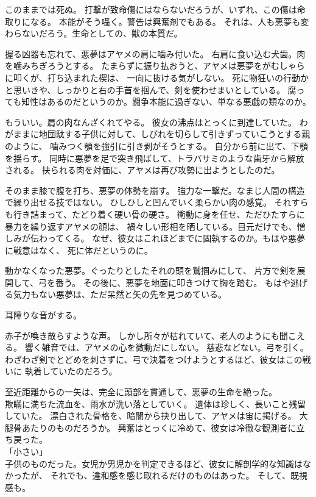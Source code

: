\documentclass[../IHMain]{subfiles}
\begin{document}
このままでは死ぬ。
打撃が致命傷にはならないだろうが、いずれ、この傷は命取りになる。
本能がそう囁く。警告は興奮剤でもある。
それは、人も悪夢も変わらないだろう。生命としての、獣の本質だ。

握る凶器も忘れて、悪夢はアヤメの肩に噛み付いた。
右肩に食い込む犬歯。肉を噛みちぎろうとする。
たまらずに振り払おうと、アヤメは悪夢をがむしゃらに叩くが、打ち込まれた楔は、
一向に抜ける気がしない。
死に物狂いの行動かと思いきや、しっかりと右の手首を掴んで、剣を使わせまいとしている。
腐っても知性はあるのだというのか。闘争本能に過ぎない、単なる悪戯の類なのか。

もういい。肩の肉なんざくれてやる。
彼女の沸点はとっくに到達していた。
わがままに地団駄する子供に対して、しびれを切らして引きずっていこうとする親のように、
噛みつく顎を強引に引き剥がそうとする。
自分から前に出て、下顎を揺らす。
同時に悪夢を足で突き飛ばして、トラバサミのような歯牙から解放される。
抉られる肉を対価に、アヤメは再び攻勢に出ようとしたのだ。

そのまま膝で腹を打ち、悪夢の体勢を崩す。
強力な一撃だ。なまじ人間の構造で繰り出せる技ではない。
ひしひしと凹んでいく柔らかい肉の感覚。
それすらも行き詰まって、たどり着く硬い骨の硬さ。
衝動に身を任せ、ただひたすらに暴力を繰り返すアヤメの顔は、
禍々しい形相を晒している。目元だけでも、憎しみが伝わってくる。
なぜ、彼女はこれほどまでに固執するのか。もはや悪夢に戦意はなく、
死に体だというのに。

動かなくなった悪夢。ぐったりとしたそれの頭を鷲掴みにして、
片方で剣を展開して、弓を番う。
その後に、悪夢を地面に叩きつけて胸を踏む。
もはや逃げる気力もない悪夢は、ただ呆然と矢の先を見つめている。

耳障りな音がする。

赤子が喚き散らすような声。
しかし所々が枯れていて、老人のようにも聞こえる。
響く雑音では、アヤメの心を微動だにしない。
慈悲などない。弓を引く。
わざわざ剣でとどめを刺さずに、弓で決着をつけようとするほど、彼女はこの戦いに
執着していたのだろう。

至近距離からの一矢は、完全に頭部を貫通して、悪夢の生命を絶った。\\

欺瞞に満ちた流血を、雨水が洗い落としていく。
遺体は珍しく、長いこと残留していた。
漂白された骨格を、暗闇から抉り出して、アヤメは宙に掲げる。
大腿骨あたりのものだろうか。
興奮はとっくに冷めて、彼女は冷徹な観測者に立ち戻った。\\
「小さい」\\
子供のものだった。女児か男児かを判定できるほど、彼女に解剖学的な知識はなかったが、
それでも、違和感を感じ取れるだけのものはあった。
そして、既視感も。
\end{document}
